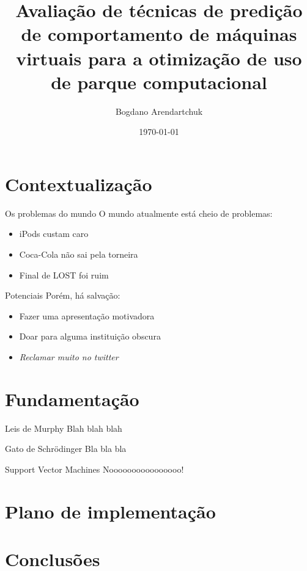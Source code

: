 \documentclass{beamer}
\institute{Universidade Tuiuti do Paraná}
\author{Bogdano Arendartchuk}
\title{Avaliação de técnicas de predição de comportamento de máquinas
virtuais para a otimização de uso de parque computacional}
\date{\today}
\begin{document}
\frame{\titlepage}

\section{Contextualização}
\begin{frame}{Os problemas do mundo}
O mundo atualmente está cheio de problemas:
\begin{itemize}
  \item iPods custam caro
  \item Coca-Cola não sai pela torneira
  \item Final de LOST foi ruim
\end{itemize}
\end{frame}
\begin{frame}{Potenciais}
Porém, há salvação:
\begin{itemize}
  \item Fazer uma apresentação motivadora
  \item Doar para alguma instituição obscura
  \item \emph{Reclamar muito no twitter}
\end{itemize}
\end{frame}

\section{Fundamentação}
\begin{frame}{Leis de Murphy}
 Blah blah blah
\end{frame}
\begin{frame}{Gato de Schrödinger}
 Bla bla bla
\end{frame}
\begin{frame}{Support Vector Machines}
 Noooooooooooooooo!
\end{frame}

\section{Plano de implementação}

\section{Conclusões}
\end{document}
